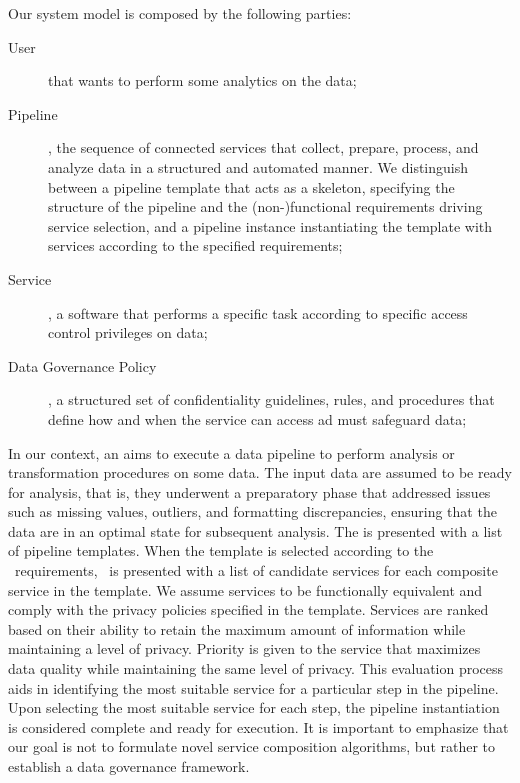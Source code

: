 Our system model is composed by the following parties:
\begin{description}
  \item[User] that wants to perform some analytics on the data;
    \item[Pipeline], the sequence of connected services that collect, prepare, process, and analyze data  in a structured and automated manner. We distinguish between a pipeline template that acts as a skeleton, specifying the structure of the pipeline and the (non-)functional requirements driving  service selection, and a pipeline instance instantiating the template with services according to the specified requirements;
    \item[Service], a software that performs a specific task according to specific access control privileges on data; %
    \item[Data Governance Policy], a structured set of confidentiality guidelines, rules, and procedures that define how and when the service can access ad must safeguard data;
\end{description}


In our context, an \user aims to execute a data pipeline to perform analysis or transformation procedures on some data.
The input data are assumed to be ready for analysis, that is, they underwent a preparatory phase that addressed issues such as missing values, outliers, and formatting discrepancies, ensuring that the data are in an optimal state for subsequent analysis.
The \user is presented with a list of pipeline templates. When the template is selected according to the \user\ requirements, \user\ is presented with a list of candidate services for each composite service in the template. We assume services to be functionally equivalent and comply with the privacy policies specified in the template.
Services are ranked based on their ability to retain the maximum amount of information while maintaining a level of privacy.
Priority is given to the service that maximizes data quality while maintaining the same level of privacy.
This evaluation process aids in identifying the most suitable service for a particular step in the pipeline.
Upon selecting the most suitable service for each step, the pipeline instantiation is considered complete and ready for execution.
It is important to emphasize that our goal is not to formulate novel service composition algorithms, but rather to establish a data governance framework.


